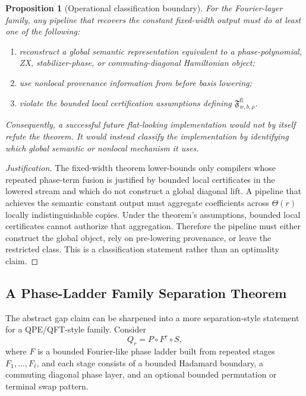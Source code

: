 \documentclass[11pt]{article}
\newtheorem{proposition}{Proposition}
\begin{document}
\begin{proposition}[Operational classification boundary]
\label{prop:classification-boundary}
For the Fourier-layer family, any pipeline that recovers the constant
fixed-width output must do at least one of the following:
\begin{enumerate}[leftmargin=1.5em]
    \item reconstruct a global semantic representation equivalent to a phase-polynomial, ZX, stabilizer-phase, or commuting-diagonal Hamiltonian object;
    \item use nonlocal provenance information from before basis lowering;
    \item violate the bounded local certification assumptions defining
    $\mathfrak{F}^{\mathrm{fl}}_{w,b,\rho}$.
\end{enumerate}
Consequently, a successful future flat-looking implementation would not by
itself refute the theorem. It would instead classify the implementation by
identifying which global semantic or nonlocal mechanism it uses.
\end{proposition}

\begin{proof}[Justification]
The fixed-width theorem lower-bounds only compilers whose repeated phase-term
fusion is justified by bounded local certificates in the lowered stream and
which do not construct a global diagonal lift. A pipeline that achieves the
semantic constant output must aggregate coefficients across $\Theta(r)$
locally indistinguishable copies. Under the theorem's assumptions, bounded
local certificates cannot authorize that aggregation. Therefore the pipeline
must either construct the global object, rely on pre-lowering provenance, or
leave the restricted class. This is a classification statement rather than an
optimality claim.
\end{proof}

\subsection{A Phase-Ladder Family Separation Theorem}

The abstract gap claim can be sharpened into a more separation-style statement
for a QPE/QFT-style family. Consider
\[
Q_r = P \circ F^r \circ S,
\]
where $F$ is a bounded Fourier-like phase ladder built from repeated stages
$F_1,\dots,F_\ell$, and each stage consists of a bounded Hadamard boundary, a
commuting diagonal phase layer, and an optional bounded permutation or terminal
swap pattern.
\end{document}
